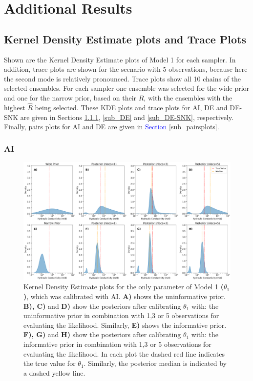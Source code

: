 \section{Additional Results}\label{additional_results}
\subsection{Kernel Density Estimate plots and Trace Plots}
Shown are the Kernel Density Estimate plots of Model 1 for each sampler. In addition, trace plots are shown for the scenario with 5 observations, because here the second mode is relatively pronounced. Trace plots show all 10 chains of the selected ensembles. For each sampler one ensemble was selected for the wide prior and one for the narrow prior, based on their $\hat{R}$, with the ensembles with the highest $\hat{R}$ being selected.  These KDE plots and trace plots for AI, DE and DE-SNK are given in Sections \ref{sub_AI}, \ref{sub_DE} and \ref{sub_DE-SNK}, respectively. Finally, pairs plots for AI and DE are given in \hyperref[sub_pairsplots]{\textcolor{blue}{Section }\ref{sub_pairsplots}}.

\newpage
\subsubsection{AI}\label{sub_AI}
\begin{figure}[ht]
\centering
\includegraphics[width=1.0\textwidth]{Figures/appendix_figs/kde_model1_Stretch.png}
\caption{Kernel Density Estimate plots for the only parameter of Model 1 \textbf{($\theta_1$)}, which was calibrated with AI. \textbf{A)} shows the uninformative prior. \textbf{B), C)} and \textbf{D)} show the posteriors after calibrating $\theta_1$ with: the uninformative prior in combination with 1,3 or 5 observations for evaluating the likelihood. Similarly, \textbf{E)} shows the informative prior. \textbf{F), G)} and \textbf{H)} show the posteriors after calibrating $\theta_1$ with: the informative prior in combination with 1,3 or 5 observations for evaluating the likelihood. In each plot the dashed red line indicates the true value for $\theta_1$. Similarly, the posterior median is indicated by a dashed yellow line.}\label{fig_kde_model1_Stretch}
\end{figure}


